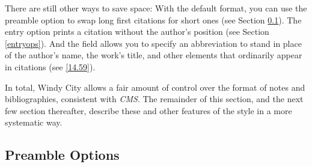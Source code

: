 \documentclass[11pt,letterpaper,oneside]{article}
\begin{document}
\begin{citeonly}
\item \cite[3]{morrison2004a}
\item \cite[18]{morrison2004a}
\item \cite[18]{morrison2004a}
\item \cite[24--26]{morrison2004a}
\item \cite[401-2]{morrison2004b}
\item \cite[433]{morrison2004b}
\item \cite[37--38]{diaz2008}
\item \cite[403]{morrison2004b}
\item \cite[152]{diaz2008}
\item \cite[201-2]{diaz2008}
\item \cites[240]{morrison2004b}[32]{morrison2004a}
\item \cite[33]{morrison2004a}
\end{citeonly}

There are still other ways to save space: With the default format, you
can use the preamble option  to swap long first
citations for short ones (see Section \ref{preops}). The entry option
 prints a citation without the author's position (see
Section \ref{entryops}). And the field  allows you
to specify an abbreviation to stand in place of the author's name, the
work's title, and other elements that ordinarily appear in citations
(see \ref{14.59}).

In total, Windy City allows a fair amount of control over the format
of notes and bibliographies, consistent with \textit{CMS}. The
remainder of this section, and the next few section thereafter,
describe these and other features of the style in a more systematic
way.

\subsection{Preamble Options}
\label{preops}
\end{document}
